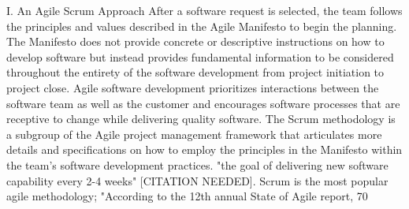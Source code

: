 I. An Agile Scrum Approach
After a software request is selected, the team follows the principles and values described in the Agile Manifesto to begin the planning. The Manifesto does not provide concrete or descriptive instructions on how to develop software but instead provides fundamental information to be considered throughout the entirety of the software development from project initiation to project close. Agile software development prioritizes interactions between the software team as well as the customer and encourages software processes that are receptive to change while delivering quality software. The Scrum methodology is a subgroup of the Agile project management framework that articulates more details and specifications on how to employ the principles in the Manifesto within the team's software development practices.  "the goal of delivering new software capability every 2-4 weeks" [CITATION NEEDED]. Scrum is the most popular agile methodology; "According to the 12th annual State of Agile report, 70%

